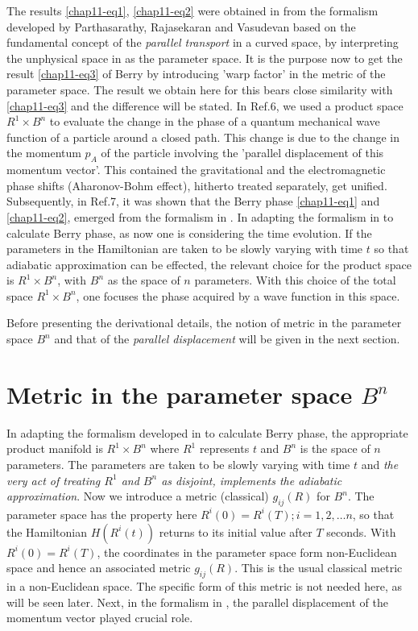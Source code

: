 The results  \eqref{chap11-eq1}, \eqref{chap11-eq2} were obtained in \cite{chap11-key7} from the formalism developed by Parthasarathy, Rajasekaran and  Vasudevan \cite{chap11-key6} based on the fundamental concept of the {\it{parallel transport}} in a curved space, by interpreting  the unphysical space in \cite{chap11-key6} as the parameter space. It is the purpose now to get the result \eqref{chap11-eq3} of Berry \cite{chap11-key5}  by introducing 'warp factor' in the metric of the parameter space. The result we obtain here for  this bears close similarity with \eqref{chap11-eq3} and the difference will be stated. In Ref.6, we used a product space $R^1 \times B^n$ to evaluate the change in the phase of a quantum mechanical wave function of a particle around a  closed path. This change is due to the change in the momentum $p_A$ of the particle involving the 'parallel  displacement of this momentum vector'. This contained the gravitational and the electromagnetic phase shifts  (Aharonov-Bohm effect), hitherto treated separately, get unified. Subsequently, in Ref.7, it was shown that the  Berry phase \eqref{chap11-eq1} and \eqref{chap11-eq2}, emerged from the formalism in \cite{chap11-key6}. In adapting the formalism in \cite{chap11-key6} to calculate Berry phase,  as now one is considering the time evolution. If  the parameters in the Hamiltonian are taken to be slowly varying with time $t$ so that adiabatic approximation  can be effected, the relevant choice for the product space is $R^1\times B^n$, with $B^n$ as the space of $n$  parameters. With this choice of the total space $R^1\times B^n$, one focuses the phase acquired by a wave function  in this space. 

Before presenting the derivational details, the notion of metric in the parameter space $B^n$ and that of the  {\textit{parallel displacement}} will be given in the next section. 

\section{Metric in the parameter space $B^n$}\label{chap11-sec2}

In adapting the formalism developed in \cite{chap11-key6} to calculate Berry phase, the appropriate product manifold is $R^1  \times B^n$ where $R^1$ represents $t$ and $B^n$ is the space of $n$ parameters. The parameters are taken to be  slowly varying with time $t$ and {\it{the very act of treating $R^1$ and $B^n$ as disjoint, implements the  adiabatic approximation}}. Now we introduce a metric (classical) $g_{ij}(R)$ for $B^n$. The parameter space has  the property here $R^i(0)=R^i(T); i=1,2,\ldots n$, so that the Hamiltonian $H(R^i(t))$ returns to its initial value  after $T$ seconds. With $R^i(0)=R^i(T)$, the coordinates in the parameter space form non-Euclidean space and hence  an associated metric $g_{ij}(R)$. This is the usual classical metric in a non-Euclidean space. The specific form  of this metric is not needed here, as will be seen later.  Next, in the formalism in \cite{chap11-key6}, the parallel displacement of the momentum vector played crucial role.  
 
